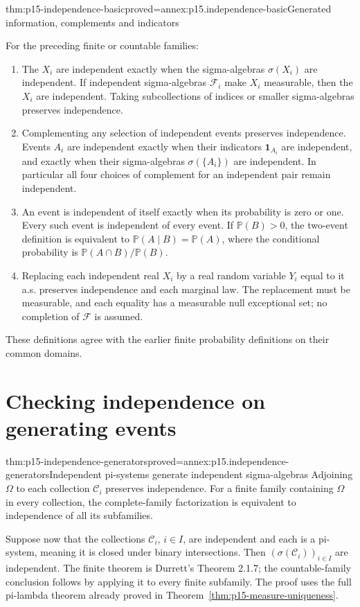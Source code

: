 \begin{hbtheorem}{thm:p15-independence-basic}{proved=annex:p15.independence-basic}{Generated information, complements and indicators}
\par\nobreak
For the preceding finite or countable families:
\begin{enumerate}
\item The \(X_i\) are independent exactly when the sigma-algebras
      \(\sigma(X_i)\) are independent. If independent sigma-algebras
      \(\mathcal F_i\) make \(X_i\) measurable, then the \(X_i\)
      are independent. Taking subcollections of indices or smaller
      sigma-algebras preserves independence.
\item Complementing any selection of independent events preserves
      independence. Events \(A_i\) are independent exactly when their
      indicators \(\mathbf1_{A_i}\) are independent, and exactly when
      their sigma-algebras \(\sigma(\{A_i\})\) are independent.
      In particular all four choices of complement for an independent
      pair remain independent.
\item An event is independent of itself exactly when its probability
      is zero or one. Every such event is independent of every event.
      If \(\mathbb P(B)>0\), the two-event definition is equivalent
      to \(\mathbb P(A\mid B)=\mathbb P(A)\), where the conditional
      probability is \(\mathbb P(A\cap B)/\mathbb P(B)\).
\item Replacing each independent real \(X_i\) by a real random variable \(Y_i\)
      equal to it a.s. preserves independence and each marginal law.
      The replacement must be measurable, and each equality has a
      measurable null exceptional set; no completion of \(\mathcal F\)
      is assumed.
\end{enumerate}
These definitions agree with the earlier finite probability definitions
on their common domains.
\end{hbtheorem}

\section{Checking independence on generating events}
\label{sec:p15-independence-generators}

\begin{hbtheorem}{thm:p15-independence-generators}{proved=annex:p15.independence-generators}{Independent pi-systems generate independent sigma-algebras}
Adjoining \(\Omega\) to each collection \(\mathcal C_i\)
preserves independence. For a finite family containing \(\Omega\)
in every collection, the complete-family factorization is equivalent
to independence of all its subfamilies.

Suppose now that the collections \(\mathcal C_i\), \(i\in I\),
are independent and each is a pi-system, meaning it is closed under
binary intersections. Then \((\sigma(\mathcal C_i))_{i\in I}\)
are independent. The finite theorem is Durrett's Theorem 2.1.7;
the countable-family conclusion follows by applying it to every finite
subfamily. The proof uses the full pi-lambda theorem already proved
in Theorem~\ref{thm:p15-measure-uniqueness}.
\end{hbtheorem}

